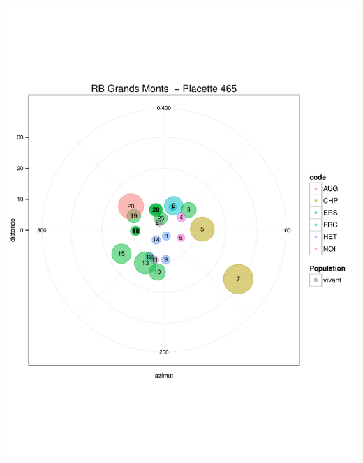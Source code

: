 \documentclass[a4paper]{book}\usepackage[]{graphicx}\usepackage[]{color}
\makeatletter
\def\maxwidth{ %
  \ifdim\Gin@nat@width>\linewidth
    \linewidth
  \else
    \Gin@nat@width
  \fi
}
\newenvironment{knitrout}{}{} %
\makeatother
\begin{document}
\begin{knitrout}
{\centering \includegraphics[width=\maxwidth]{Figures/PlanArbres-51} 

}





\end{knitrout}
\end{document}
